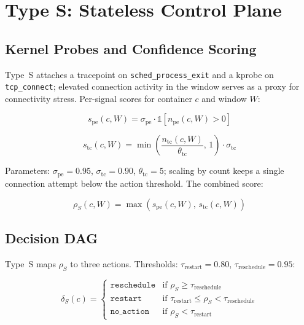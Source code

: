 \documentclass[conference]{IEEEtran}
\begin{document}
\section{Type S: Stateless Control Plane}
\label{sec:types}

\subsection{Kernel Probes and Confidence Scoring}

Type~S attaches a tracepoint on \texttt{sched\_process\_exit} and a kprobe on \texttt{tcp\_connect}; elevated connection activity in the window serves as a proxy for connectivity stress. Per-signal scores for container $c$ and window $W$:

\begin{equation}
s_{\mathrm{pe}}(c, W) = \sigma_{\mathrm{pe}} \cdot \mathds{1}\!\left[n_{\mathrm{pe}}(c, W) > 0\right]
\label{eq:spe}
\end{equation}

\begin{equation}
s_{\mathrm{tc}}(c, W) = \min\!\left(\frac{n_{\mathrm{tc}}(c, W)}{\theta_{\mathrm{tc}}},\, 1\right) \cdot \sigma_{\mathrm{tc}}
\label{eq:stc}
\end{equation}

Parameters: $\sigma_{\mathrm{pe}} = 0.95$, $\sigma_{\mathrm{tc}} = 0.90$, $\theta_{\mathrm{tc}} = 5$; scaling by count keeps a single connection attempt below the action threshold. The combined score:

\begin{equation}
\rho_S(c, W) = \max(s_{\mathrm{pe}}(c, W),\, s_{\mathrm{tc}}(c, W))
\label{eq:rhoS}
\end{equation}

\subsection{Decision DAG}

Type~S maps $\rho_S$ to three actions. Thresholds: $\tau_{\mathrm{restart}} = 0.80$, $\tau_{\mathrm{reschedule}} = 0.95$:

\begin{equation}
\delta_S(c) =
\begin{cases}
\texttt{reschedule} & \text{if } \rho_S \geq \tau_{\mathrm{reschedule}} \\
\texttt{restart}    & \text{if } \tau_{\mathrm{restart}} \leq \rho_S < \tau_{\mathrm{reschedule}} \\
\texttt{no\_action} & \text{if } \rho_S < \tau_{\mathrm{restart}}
\end{cases}
\label{eq:deltaS}
\end{equation}
\end{document}
